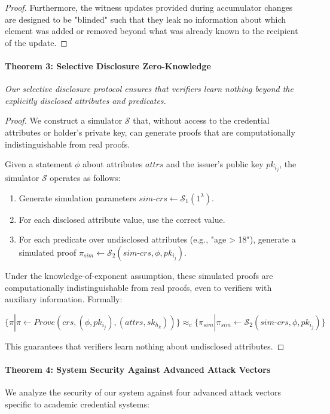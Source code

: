 \documentclass[lettersize,journal]{IEEEtran}
\begin{document}
\begin{itemize}
\begin{proof}
Furthermore, the witness updates provided during accumulator changes are designed to be "blinded" such that they leak no information about which element was added or removed beyond what was already known to the recipient of the update.
\end{proof}

\paragraph{Theorem 3: Selective Disclosure Zero-Knowledge}
\textit{Our selective disclosure protocol ensures that verifiers learn nothing beyond the explicitly disclosed attributes and predicates.}

\begin{proof}
We construct a simulator $\mathcal{S}$ that, without access to the credential attributes or holder's private key, can generate proofs that are computationally indistinguishable from real proofs.

Given a statement $\phi$ about attributes $attrs$ and the issuer's public key $pk_{i_j}$, the simulator $\mathcal{S}$ operates as follows:

\begin{enumerate}
    \item Generate simulation parameters $sim\text{-}crs \leftarrow \mathcal{S}_1(1^\lambda)$.
    \item For each disclosed attribute value, use the correct value.
    \item For each predicate over undisclosed attributes (e.g., "age > 18"), generate a simulated proof $\pi_{sim} \leftarrow \mathcal{S}_2(sim\text{-}crs, \phi, pk_{i_j})$.
\end{enumerate}

Under the knowledge-of-exponent assumption, these simulated proofs are computationally indistinguishable from real proofs, even to verifiers with auxiliary information. Formally:

$$\{\pi | \pi \leftarrow Prove(crs, (\phi, pk_{i_j}), (attrs, sk_{h_k}))\} \approx_c \{\pi_{sim} | \pi_{sim} \leftarrow \mathcal{S}_2(sim\text{-}crs, \phi, pk_{i_j})\}$$

This guarantees that verifiers learn nothing about undisclosed attributes.
\end{proof}

\paragraph{Theorem 4: System Security Against Advanced Attack Vectors}
We analyze the security of our system against four advanced attack vectors specific to academic credential systems:


\end{itemize}
\end{document}
